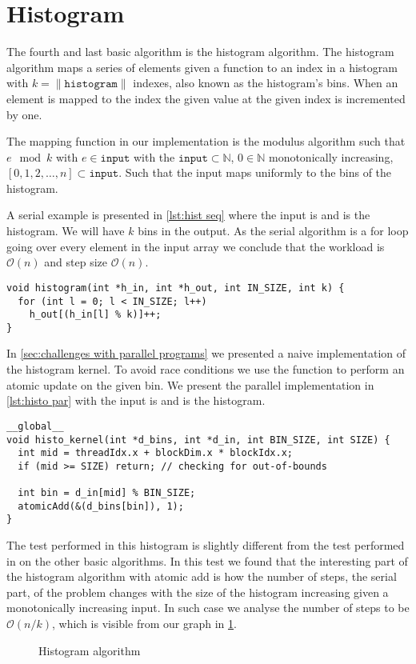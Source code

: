 \section{Histogram}
\label{sec:histogram}

The fourth and last basic algorithm is the histogram algorithm.
The histogram algorithm maps a series of elements given a function to an index in a histogram with $k = \|\mathtt{histogram}\|$ indexes, also known as the histogram's bins.
When an element is mapped to the index the given value at the given index is incremented by one.

The mapping function in our implementation is the modulus algorithm such that $e \mod k$ with $e \in \mathtt{input}$ with the $\mathtt{input} \subset \mathbb{N}$, $0 \in \mathbb{N}$ monotonically increasing, $[0, 1, 2, \ldots, n] \subset \mathtt{input}$.
Such that the input maps uniformly to the bins of the histogram.

A serial example is presented in \cref{lst:hist seq} where the input is  and  is the histogram.
We will have $k$ bins in the output.
As the serial algorithm is a for loop going over every element in the input array we conclude that the workload is $\mathcal{O}(n)$ and step size $\mathcal{O}(n)$.

\begin{lstlisting}[caption={Serial histogram}, label={lst:hist seq}]
void histogram(int *h_in, int *h_out, int IN_SIZE, int k) {
  for (int l = 0; l < IN_SIZE; l++) 
    h_out[(h_in[l] % k)]++;
}
\end{lstlisting}

In \cref{sec:challenges with parallel programs} we presented a naive implementation of the histogram kernel.
To avoid race conditions we use the  function to perform an atomic update on the given bin.
We present the parallel implementation in \cref{lst:histo par} with the input is  and  is the histogram.

\begin{lstlisting}[caption={Simple parallel histogram implementation}, label={lst:histo par}]
__global__ 
void histo_kernel(int *d_bins, int *d_in, int BIN_SIZE, int SIZE) {
  int mid = threadIdx.x + blockDim.x * blockIdx.x;
  if (mid >= SIZE) return; // checking for out-of-bounds

  int bin = d_in[mid] % BIN_SIZE;
  atomicAdd(&(d_bins[bin]), 1);
}
\end{lstlisting}

The test performed in this histogram is slightly different from the test performed in on the other basic algorithms.
In this test we found that the interesting part of the histogram algorithm with atomic add is how the number of steps, the serial part, of the problem changes with the size of the histogram increasing given a monotonically increasing input.
In such case we analyse the number of steps to be $\mathcal{O}(n/k)$, which is visible from our graph in \cref{fig:histogram plot}.

\begin{figure}[htb]
  \centering
    
  \caption{Histogram algorithm}
  \label{fig:histogram plot}
\end{figure}
